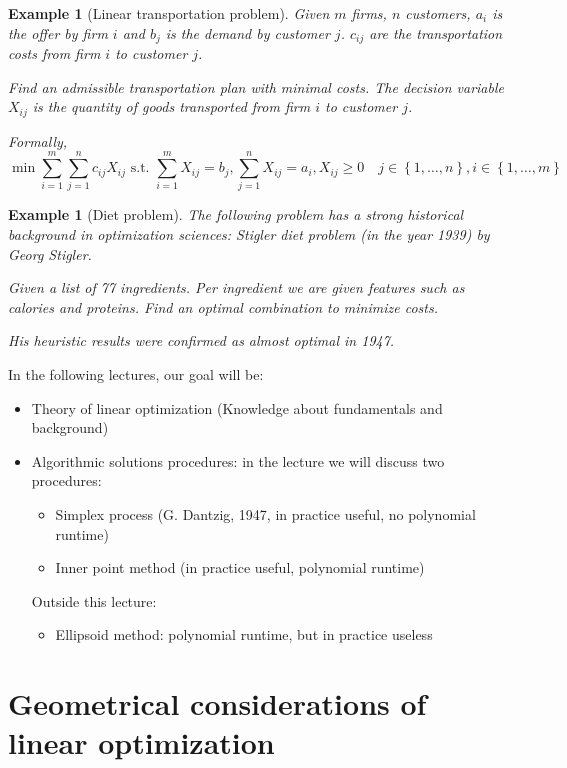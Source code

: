 \documentclass{article}
\numberwithin{lecref}{section}
\newcounter{exercises}
\newtheorem{example}[exercises]{Example}
\newtheorem*{Example}{Example}
\newcommand{\Set}[1]{\left\{#1\right\}}
\begin{document}
\begin{example}[Linear transportation problem]
  \label{example:3}
  Given $m$ firms, $n$ customers, $a_i$ is the offer by firm $i$ and $b_j$ is the demand by customer $j$.
  $c_{ij}$ are the transportation costs from firm $i$ to customer $j$.

  Find an admissible transportation plan with minimal costs.
  The decision variable $X_{ij}$ is the quantity of goods transported from firm $i$ to customer $j$.

  Formally,
  \[ \min{\sum_{i=1}^m \sum_{j=1}^n c_{ij} X_{ij}} \text{ s.t. } \sum_{i=1}^m X_{ij} = b_j, \sum_{j=1}^n X_{ij} = a_i, X_{ij} \geq 0 \quad j \in \Set{1, \dots, n}, i \in \Set{1, \dots, m} \]
\end{example}

\begin{Example}[Diet problem]
  The following problem has a strong historical background in optimization sciences:
  Stigler diet problem (in the year 1939) by Georg Stigler. 

  Given a list of 77 ingredients. Per ingredient we are given features such as calories and proteins.
  Find an optimal combination to minimize costs.

  His heuristic results were confirmed as almost optimal in 1947.
\end{Example}

In the following lectures, our goal will be:

\begin{itemize}
	\item Theory of linear optimization (Knowledge about fundamentals and background)
	\item Algorithmic solutions procedures: in the lecture we will discuss two procedures:
		\begin{itemize}
			\item Simplex process (G. Dantzig, 1947, in practice useful, no polynomial runtime)
			\item Inner point method (in practice useful, polynomial runtime)
		\end{itemize}
		Outside this lecture:
		\begin{itemize}
			\item Ellipsoid method: polynomial runtime, but in practice useless
		\end{itemize}
\end{itemize}

\section{Geometrical considerations of linear optimization}
\end{document}
